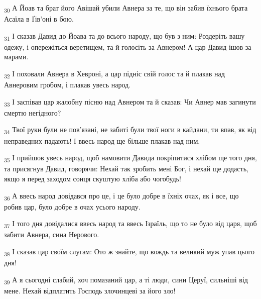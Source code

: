 \begin{tcolorbox}
\textsubscript{30} А Йоав та брат його Авішай убили Авнера за те, що він забив їхнього брата Асаїла в Ґів'оні в бою.
\end{tcolorbox}
\begin{tcolorbox}
\textsubscript{31} І сказав Давид до Йоава та до всього народу, що був з ним: Роздеріть вашу одежу, і опережіться веретищем, та й голосіть за Авнером! А цар Давид ішов за марами.
\end{tcolorbox}
\begin{tcolorbox}
\textsubscript{32} І поховали Авнера в Хевроні, а цар підніс свій голос та й плакав над Авнеровим гробом, і плакав увесь народ.
\end{tcolorbox}
\begin{tcolorbox}
\textsubscript{33} І заспівав цар жалобну пісню над Авнером та й сказав: Чи Авнер мав загинути смертю негідного?
\end{tcolorbox}
\begin{tcolorbox}
\textsubscript{34} Твої руки були не пов'язані, не забиті були твої ноги в кайдани, ти впав, як від неправедних падають! І ввесь народ ще більше плакав над ним.
\end{tcolorbox}
\begin{tcolorbox}
\textsubscript{35} І прийшов увесь народ, щоб намовити Давида покріпитися хлібом ще того дня, та присягнув Давид, говорячи: Нехай так зробить мені Бог, і нехай ще додасть, якщо я перед заходом сонця скуштую хліба або чогобудь!
\end{tcolorbox}
\begin{tcolorbox}
\textsubscript{36} А ввесь народ довідався про це, і це було добре в їхніх очах, як і все, що робив цар, було добре в очах усього народу.
\end{tcolorbox}
\begin{tcolorbox}
\textsubscript{37} І того дня довідалися ввесь народ та ввесь Ізраїль, що то не було від царя, щоб забити Авнера, сина Нерового.
\end{tcolorbox}
\begin{tcolorbox}
\textsubscript{38} І сказав цар своїм слугам: Ото ж знайте, що вождь та великий муж упав цього дня!
\end{tcolorbox}
\begin{tcolorbox}
\textsubscript{39} А я сьогодні слабий, хоч помазаний цар, а ті люди, сини Церуї, сильніші від мене. Нехай відплатить Господь злочинцеві за його зло!
\end{tcolorbox}
